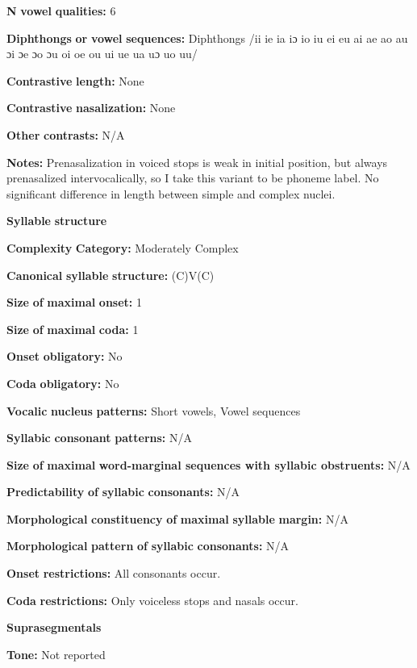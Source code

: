 \textbf{N} \textbf{vowel} \textbf{qualities:} 6

\textbf{Diphthongs} \textbf{or} \textbf{vowel} \textbf{sequences:} Diphthongs /ii ie ia iɔ io iu ei eu ai ae ao au ɔi ɔe ɔo ɔu oi oe ou ui ue ua uɔ uo uu/

\textbf{Contrastive} \textbf{length:} None

\textbf{Contrastive} \textbf{nasalization:} None

\textbf{Other} \textbf{contrasts:} N/A

\textbf{Notes:} Prenasalization in voiced stops is weak in initial position, but always prenasalized intervocalically, so I take this variant to be phoneme label. No significant difference in length between simple and complex nuclei.

\textbf{Syllable} \textbf{structure}

\textbf{Complexity} \textbf{Category:} Moderately Complex

\textbf{Canonical} \textbf{syllable} \textbf{structure:} (C)V(C) \citep[14-18]{McElhanon1970}

\textbf{Size} \textbf{of} \textbf{maximal} \textbf{onset:} 1

\textbf{Size} \textbf{of} \textbf{maximal} \textbf{coda:} 1

\textbf{Onset} \textbf{obligatory:} No

\textbf{Coda} \textbf{obligatory:} No

\textbf{Vocalic} \textbf{nucleus} \textbf{patterns:} Short vowels, Vowel sequences

\textbf{Syllabic} \textbf{consonant} \textbf{patterns:} N/A

\textbf{Size} \textbf{of} \textbf{maximal} \textbf{word{}-marginal sequences with syllabic obstruents:} N/A

\textbf{Predictability} \textbf{of} \textbf{syllabic} \textbf{consonants:} N/A

\textbf{Morphological} \textbf{constituency} \textbf{of} \textbf{maximal} \textbf{syllable} \textbf{margin:} N/A

\textbf{Morphological} \textbf{pattern} \textbf{of} \textbf{syllabic} \textbf{consonants:} N/A

\textbf{Onset} \textbf{restrictions:} All consonants occur.

\textbf{Coda} \textbf{restrictions:} Only voiceless stops and nasals occur.

\textbf{Suprasegmentals}

\textbf{Tone:} Not reported

